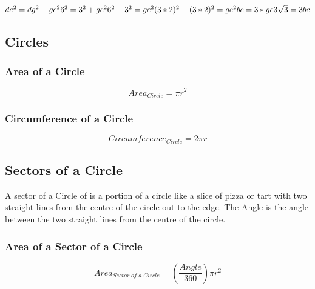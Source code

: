 \documentclass{article}
\begin{document}
$de^2 = dg^2 + ge^2 \\
6^2 = 3^2 + ge^2 \\
6^2 - 3^2 = ge^2 \\
(3*2)^2 - (3*2)^2 = ge^2 \\
bc = 3 *  ge \\
3\sqrt{3} = 3 bc$



\newpage
\subsection{Circles}
\subsubsection{Area of a Circle}
\begin{equation}
Area_{ Circle} = \pi r^ 2
\end{equation}
\subsubsection{Circumference of a Circle}
\begin{equation}
Circumference_{ Circle} = 2 \pi r
\end{equation}
\subsection{Sectors of a Circle}
A sector of a Circle of is a portion of a circle like a slice of pizza or tart with two straight lines from the centre of the circle out to the edge. The Angle is the angle between the two straight lines from the centre of the circle.
\subsubsection{Area of a Sector of a Circle}
\begin{equation}
Area_{ Sector\;of\;a\;Circle} = ( \frac{Angle }{ 360 }) \pi r^ 2
\end{equation}
\end{document}
